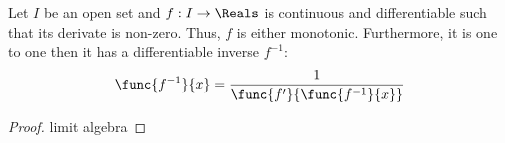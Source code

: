 \begin{theorem}
    Let \(I\) be an open set and \(f : I \to \Reals\) is continuous and differentiable such that its derivate is non-zero. Thus, \(f\) is either monotonic. Furthermore, it is one to one then it has a differentiable inverse \(f^{-1}\):
    \begin{equation*} 
        \func{f^{-1}}{x} = \dfrac{1}{\func{f'}{\func{f^{-1}}{x}}}
     \end{equation*}
\end{theorem}
\begin{proof}
    limit algebra
\end{proof}
